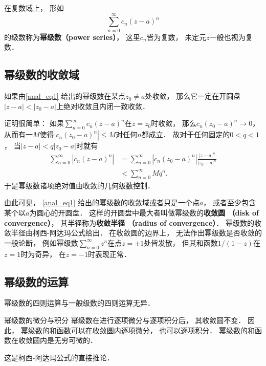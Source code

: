 

在复数域上， 形如
\begin{equation}\label{anal_eq1}
\sum_{n=0}^\infty c_n(z-a)^n
\end{equation}
的级数称为\textbf{幂级数（power series）}， 这里$c_n$皆为复数， 未定元$z$一般也视为复数． 

\subsection{幂级数的收敛域}
\begin{theorem}{}
如果由\autoref{anal_eq1} 给出的幂级数在某点$z_0\neq a$处收敛， 那么它一定在开圆盘$|z-a|<|z_0-a|$上绝对收敛且内闭一致收敛．
\end{theorem}

证明很简单： 如果$\sum_{n=0}^\infty c_n(z-a)^n$在$z=z_0$时收敛， 那么$c_n(z_0-a)^n\to0$， 从而有一$M$使得$|c_n(z_0-a)^n|\leq M$对任何$n$都成立． 故对于任何固定的$0<q<1$， 当$|z-a|<q|z_0-a|$时就有
$$
\begin{aligned}
\sum_{n=0}^\infty |c_n(z-a)^n|
&=\sum_{n=0}^\infty |c_n(z_0-a)^n|\frac{|z-a|^n}{|z_0-a|^n}\\
&<\sum_{n=0}^\infty Mq^n.
\end{aligned}
$$
于是幂级数诸项绝对值由收敛的几何级数控制．

由此可见， \autoref{anal_eq1} 给出的幂级数的收敛域或者只是一个点$a$， 或者至少包含某个以$a$为圆心的开圆盘． 这样的开圆盘中最大者叫做幂级数的\textbf{收敛圆 （disk of convergence）}， 其半径称为\textbf{收敛半径 （radius of convergence）}． 幂级数的收敛半径由柯西-阿达玛公式给出． 在收敛圆的边界上， 无法作出幂级数是否收敛的一般论断， 例如幂级数$\sum_{n=0}^\infty z^n$在点$z=\pm1$处皆发散， 但其和函数$1/(1-z)$在$z=1$时为奇异， 在$z=-1$时表现正常．

\subsection{幂级数的运算}
幂级数的四则运算与一般级数的四则运算无异．

\begin{theorem}{幂级数的微分与积分}
幂级数在进行逐项微分与逐项积分后， 其收敛圆不变． 因此， 幂级数的和函数可以在收敛圆内逐项微分， 也可以逐项积分． 幂级数的和函数在收敛圆内是无穷可微的．
\end{theorem}
这是柯西-阿达玛公式的直接推论． 

